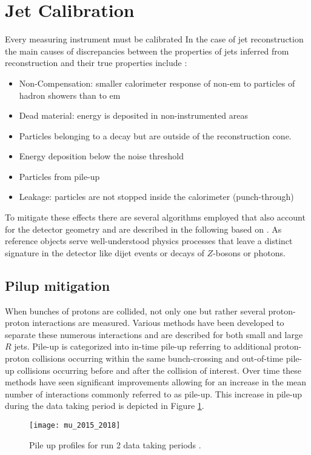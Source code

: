 \section{Jet Calibration}\label{sec:calibration}
Every measuring instrument must be calibrated In the case of jet reconstruction the main causes of discrepancies between the properties of jets inferred from reconstruction and their true properties include \citep{atlas2011jet}:
\begin{itemize}
  \item Non-Compensation: smaller calorimeter response of non-\ac{em} to particles of hadron showers than to \ac{em}
  \item Dead material: energy is deposited in non-instrumented areas
  \item Particles belonging to a decay but are outside of the reconstruction cone.
  \item Energy deposition below the noise threshold
  \item Particles from pile-up
  \item Leakage: particles are not stopped inside the calorimeter (punch-through)
\end{itemize}
To mitigate these effects there are several algorithms employed that also account for the detector geometry and are described in the following based on \citep{atlas2021jet}. As reference objects serve well-understood physics processes that leave a distinct signature in the detector like dijet events or decays of $Z$-bosons or photons.

\subsection{Pilup mitigation}
When bunches of protons are collided, not only one but rather several proton-proton interactions are measured. Various methods have been developed to separate these numerous interactions and are described for both small and large $R$ jets. Pile-up is categorized into in-time pile-up referring to additional proton-proton collisions occurring within the same bunch-crossing and out-of-time pile-up collisions occurring before and after the collision of interest. Over time these methods have seen significant improvements allowing for an increase in the mean number of interactions commonly referred to as pile-up. This increase in pile-up during the data taking period is depicted in Figure \ref{fig:pileup}.
\begin{figure}
  \centering
  \texttt{[image: mu\_2015\_2018]}
  \caption[]{Pile up profiles for run 2 data taking periods \citep{pileup}.}
  \label{fig:pileup}
\end{figure}


